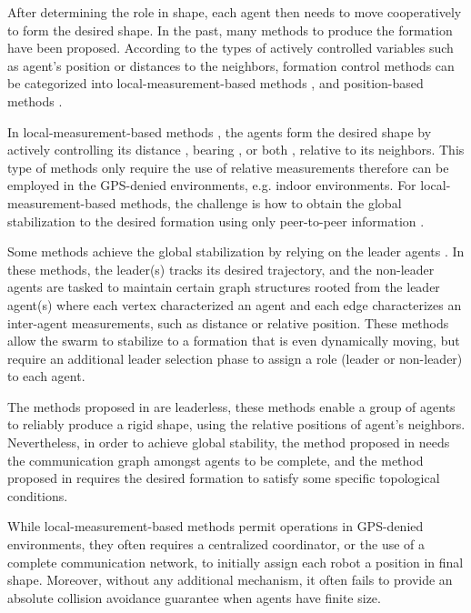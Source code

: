 \documentclass[journal]{IEEEtran}
\begin{document}
After determining the role in shape, each agent then needs to move cooperatively to form the desired shape. In the past, many methods to produce the formation have been proposed. According to the types of actively controlled variables \cite{survey} such as agent's position or distances to the neighbors, formation control methods can be categorized into local-measurement-based methods \cite{graphtext, distance, dis1, dis2, dis3, dis4, bearing, displacement, pos1, pos2, pos3, pos5, rhc}, and position-based methods \cite{e1, capt, centralized, goalassign, d1,d2,d3,timeopt, c1,c2,c3,global, orca, van2011reciprocal, alonso2018cooperative, bufferedvonori,rrt, swarmbarrier, p1,p2, p3, capt,pri,peter}. 


In local-measurement-based methods \cite{graphtext}, the agents form the desired shape by actively controlling its distance \cite{distance,dis1,dis2,dis3,dis4}, bearing \cite{bearing}, or both \cite{displacement,pos1,pos2,pos3,pos5}, relative to its neighbors. This type of methods only require the use of relative measurements therefore can be employed in the GPS-denied environments, e.g. indoor environments. For local-measurement-based methods, the challenge is how to obtain the global stabilization to the desired formation using only peer-to-peer information \cite{displacement}. 


Some methods achieve the global stabilization by relying on the leader agents \cite{dis4,pos2,pos3,pos5}. In these methods, the leader(s) tracks its desired trajectory, and the non-leader agents are tasked to maintain certain graph structures rooted from the leader agent(s) where each vertex characterized an agent and each edge characterizes an inter-agent measurements, such as  distance or relative position. These methods allow the swarm to stabilize to a formation that is even dynamically moving, but require an additional leader selection phase to assign a role (leader or non-leader) to each agent.



The methods proposed in \cite{displacement, pos1} are leaderless, these methods enable a group of
agents to reliably produce a rigid shape, using the relative positions of agent's neighbors. Nevertheless, in order to achieve global stability, the method proposed in \cite{pos1} needs the communication graph amongst agents to be complete, and the method proposed in \cite{displacement} requires the desired formation to satisfy some specific topological conditions.


While local-measurement-based methods permit operations in GPS-denied environments, they often requires a centralized coordinator, or the use of a complete communication network, to initially assign each robot a position in final shape. Moreover, without any additional mechanism, it often fails to provide an absolute collision avoidance guarantee when agents have finite size.
\end{document}
